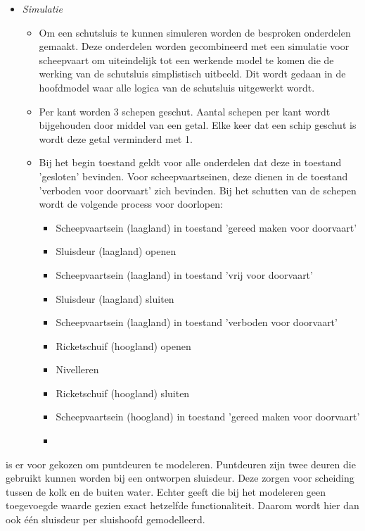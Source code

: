 \documentclass{article}
\begin{document}
\begin{itemize}
        \item \textit{Simulatie}
        \begin{itemize}
            \item Om een schutsluis te kunnen simuleren worden de besproken onderdelen gemaakt.
            Deze onderdelen worden gecombineerd met een simulatie voor scheepvaart om uiteindelijk
            tot een werkende model te komen die de werking van de schutsluis simplistisch uitbeeld.
            Dit wordt gedaan in de hoofdmodel waar alle logica van de schutsluis uitgewerkt wordt.
            \item Per kant worden 3 schepen geschut. Aantal schepen per kant wordt bijgehouden
            door middel van een getal. Elke keer dat een schip geschut is wordt deze getal verminderd met 1.
            \item Bij het begin toestand geldt voor alle onderdelen dat deze in toestand 'gesloten' bevinden.
            Voor scheepvaartseinen, deze dienen in de toestand 'verboden voor doorvaart' zich bevinden. 
            Bij het schutten van de schepen wordt de volgende process voor doorlopen:
                \begin{itemize}
                    \item Scheepvaartsein (laagland) in toestand 'gereed maken voor doorvaart'
                    \item Sluisdeur (laagland) openen
                    \item Scheepvaartsein (laagland) in toestand 'vrij voor doorvaart'
                    \item Sluisdeur (laagland) sluiten
                    \item Scheepvaartsein (laagland) in toestand 'verboden voor doorvaart'
                    \item Ricketschuif (hoogland) openen
                    \item Nivelleren
                    \item Ricketschuif (hoogland) sluiten
                    \item Scheepvaartsein (hoogland) in toestand 'gereed maken voor doorvaart'
                    \item 
                \end{itemize}
        \end{itemize}
    \end{itemize}
    
    
    is er voor gekozen om puntdeuren te modeleren. Puntdeuren zijn 
    twee deuren die gebruikt kunnen worden bij een ontworpen sluisdeur. Deze zorgen 
    voor scheiding tussen de kolk en de buiten water. Echter geeft die bij het 
    modeleren geen toegevoegde waarde gezien exact hetzelfde functionaliteit.
    Daarom wordt hier dan ook één sluisdeur per sluishoofd gemodelleerd.
\end{document}
